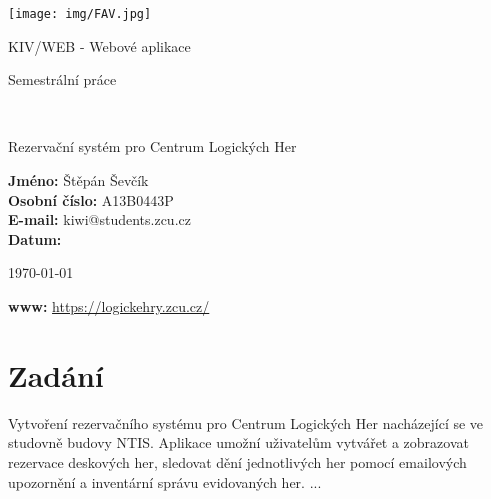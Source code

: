 \documentclass[12pt,a4paper]{article}
\author{Jan Šmejkal}
\let\oldsection\section
\renewcommand\section{\clearpage\oldsection}
\begin{document}
\begin{titlepage}

\texttt{[image: img/FAV.jpg]}
\\[160 pt]
\centerline{ \Huge \sc KIV/WEB - Webové aplikace}
\centerline{ \huge \sc Semestrální práce }
\\[12 pt]
{\large \sc
\centerline{Rezervační systém pro Centrum Logických Her}
}


{
\vfill 
\parindent=0cm
\textbf{Jméno:} Štěpán Ševčík\\
\textbf{Osobní číslo:} A13B0443P\\
\textbf{E-mail:} kiwi@students.zcu.cz\\
\textbf{Datum:} {\large \today\par} %
\textbf{www:} \url{https://logickehry.zcu.cz/}

}

\end{titlepage}


\newpage
\setcounter{page}{2}
\setcounter{tocdepth}{3}
\tableofcontents

\section{Zadání}
Vytvoření rezervačního systému pro Centrum Logických Her nacházející se ve studovně budovy NTIS. Aplikace umožní uživatelům vytvářet a zobrazovat rezervace deskových her, sledovat dění jednotlivých her pomocí emailových upozornění a inventární správu evidovaných her. ...
\end{document}
